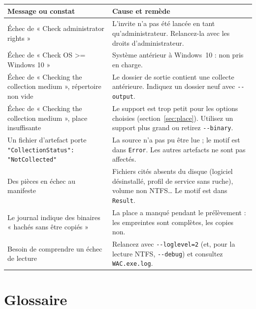 \documentclass[11pt,a4paper,oneside]{report}
\newcommand{\opt}[1]{\texttt{-{}-#1}}
\newcommand{\champ}[1]{\texttt{#1}}
\newcommand{\fichier}[1]{\texttt{#1}}
\begin{document}
\begin{longtable}{@{}L{5cm}L{9.4cm}@{}}
\toprule
\bfseries Message ou constat & \bfseries Cause et remède \\
\midrule
\endhead
Échec de « Check administrator rights » & L'invite n'a pas été lancée en tant
  qu'administrateur. Relancez-la avec les droits d'administrateur. \\
Échec de « Check OS >= Windows 10 » & Système antérieur à Windows~10 : non pris
  en charge. \\
Échec de « Checking the collection medium », répertoire non vide & Le dossier de
  sortie contient une collecte antérieure. Indiquez un dossier neuf avec
  \opt{output}. \\
Échec de « Checking the collection medium », place insuffisante & Le support
  est trop petit pour les options choisies (section~\ref{sec:place}). Utilisez un
  support plus grand ou retirez \opt{binary}. \\
Un fichier d'artefact porte \texttt{"CollectionStatus": "NotCollected"} &
  La source n'a pas pu être lue ; le motif est dans \champ{Error}. Les autres
  artefacts ne sont pas affectés. \\
Des pièces en échec au manifeste & Fichiers cités absents du disque (logiciel
  désinstallé, profil de service sans ruche), volume non NTFS\ldots{} Le motif est
  dans \champ{Result}. \\
Le journal indique des binaires « hachés sans être copiés » & La place a manqué
  pendant le prélèvement : les empreintes sont complètes, les copies non. \\
Besoin de comprendre un échec de lecture & Relancez avec \opt{loglevel=2} (et, pour
  la lecture NTFS, \opt{debug}) et consultez \fichier{WAC.exe.log}. \\
\bottomrule
\end{longtable}

\appendix

\chapter{Glossaire}
\end{document}
